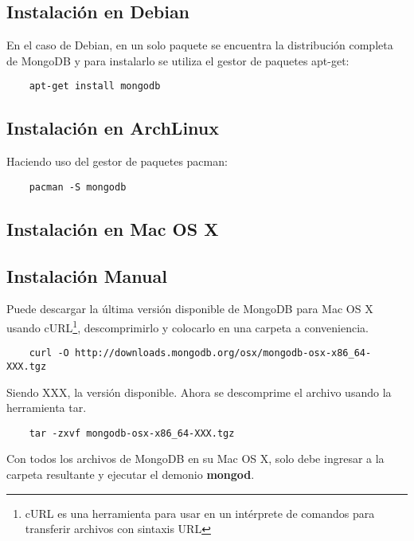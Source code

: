\subsection*{Instalaci\'on en Debian}

En el caso de Debian, en un solo paquete se encuentra la distribuci\'on completa de MongoDB y para instalarlo se utiliza el gestor de paquetes apt-get:

\begin{lstlisting}
    apt-get install mongodb
\end{lstlisting}

\subsection*{Instalaci\'on en ArchLinux}

Haciendo uso del gestor de paquetes pacman:

\begin{lstlisting}
    pacman -S mongodb
\end{lstlisting}

\subsection{Instalaci\'on en Mac OS X}

\subsection*{Instalaci\'on Manual}

Puede descargar la \'ultima versi\'on disponible de MongoDB para Mac OS X usando cURL\footnote{cURL es una herramienta para usar en un intérprete de comandos para transferir archivos con sintaxis URL}, descomprimirlo y colocarlo en una carpeta a conveniencia.

\begin{lstlisting}
    curl -O http://downloads.mongodb.org/osx/mongodb-osx-x86_64-XXX.tgz
\end{lstlisting}

Siendo XXX, la versi\'on disponible. Ahora se descomprime el archivo usando la herramienta tar.

\begin{lstlisting}
    tar -zxvf mongodb-osx-x86_64-XXX.tgz
\end{lstlisting}

Con todos los archivos de MongoDB en su Mac OS X, solo debe ingresar a la carpeta resultante y ejecutar el demonio \textbf{mongod}.

